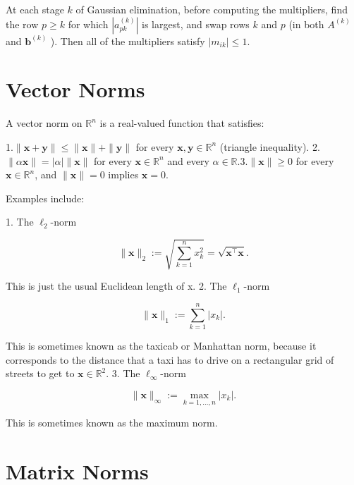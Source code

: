 \begin{method}
  At each stage \(k\) of Gaussian elimination, before computing the multipliers, find the row \(p \geq k\) for which \(\left|a_{p k}^{(k)}\right|\) is largest, and swap rows \(k\) and \(p\) (in both \(A^{(k)}\) and \(\mathbf{b}^{(k)}\) ). Then all of the multipliers satisfy \(\left|m_{i k}\right| \leq 1\).
\end{method}

\section{Vector Norms}

\begin{definition}
  A vector norm on \(\mathbb{R}^n\) is a real-valued function that satisfies:

  1.\(\|\mathbf{x}+\mathbf{y}\| \leq\|\mathbf{x}\|+\|\mathbf{y}\|\) for every \(\mathbf{x}, \mathbf{y} \in \mathbb{R}^n\) (triangle inequality). 2. \(\|\alpha \mathbf{x}\|=|\alpha|\|\mathbf{x}\|\) for every \(\mathbf{x} \in \mathbb{R}^n\) and every \(\alpha \in \mathbb{R} .3 .\|\mathbf{x}\| \geq 0\) for every \(\mathbf{x} \in \mathbb{R}^n\), and \(\|\mathbf{x}\|=0\) implies \(\mathbf{x}=0\).

  Examples include:

1. The \(\ell_2\)-norm

\[
\|\mathbf{x}\|_2:=\sqrt{\sum_{k=1}^n x_k^2}=\sqrt{\mathbf{x}^{\top} \mathbf{x}} .
\]

This is just the usual Euclidean length of x.
2. The \(\ell_1\)-norm

\[
\|\mathbf{x}\|_1:=\sum_{k=1}^n\left|x_k\right| .
\]

This is sometimes known as the taxicab or Manhattan norm, because it corresponds to the distance that a taxi has to drive on a rectangular grid of streets to get to \(\mathbf{x} \in \mathbb{R}^2\).
3. The \(\ell_{\infty}\)-norm

\[
\|\mathbf{x}\|_{\infty}:=\max _{k=1, \ldots, n}\left|x_k\right| .
\]

This is sometimes known as the maximum norm.
\end{definition}


\section{Matrix Norms}

